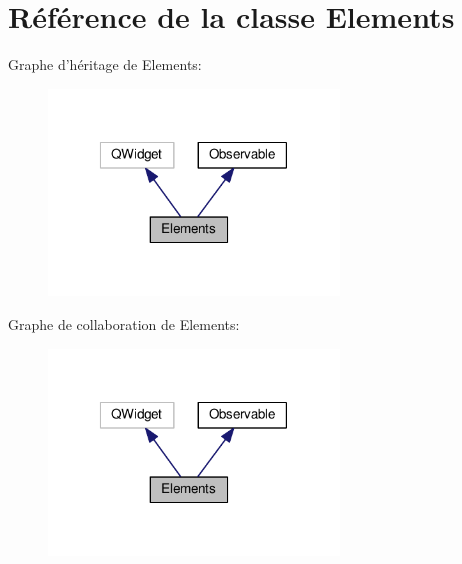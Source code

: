 \hypertarget{classElements}{\section{Référence de la classe Elements}
\label{classElements}
}


Graphe d'héritage de Elements\+:
\nopagebreak
\begin{figure}[H]
\begin{center}
\leavevmode
\includegraphics[width=219pt]{da/d2c/classElements__inherit__graph}
\end{center}
\end{figure}


Graphe de collaboration de Elements\+:
\nopagebreak
\begin{figure}[H]
\begin{center}
\leavevmode
\includegraphics[width=219pt]{d3/d60/classElements__coll__graph}
\end{center}
\end{figure}
